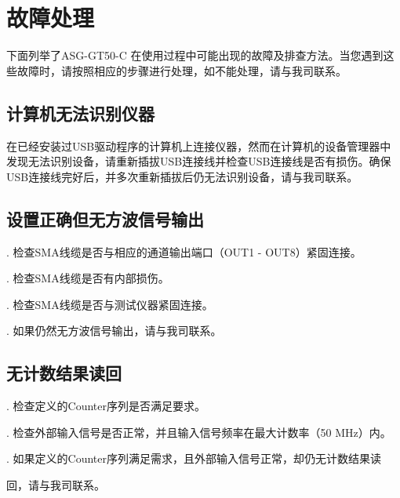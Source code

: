 \chapter{\heiti 故障处理}
下面列举了ASG-GT50-C 在使用过程中可能出现的故障及排查方法。当您遇到这些故障时，请按照相应的步骤进行处理，如不能处理，请与我司联系。

\section{\heiti 计算机无法识别仪器}
在已经安装过USB驱动程序的计算机上连接仪器，然而在计算机的设备管理器中发现无法识别设备，请重新插拔USB连接线并检查USB连接线是否有损伤。确保USB连接线完好后，并多次重新插拔后仍无法识别设备，请与我司联系。

\section{\heiti 设置正确但无方波信号输出}
. 检查SMA线缆是否与相应的通道输出端口（OUT1 - OUT8）紧固连接。 

. 检查SMA线缆是否有内部损伤。

. 检查SMA线缆是否与测试仪器紧固连接。

. 如果仍然无方波信号输出，请与我司联系。


\section{\heiti 无计数结果读回}
. 检查定义的Counter序列是否满足要求。

. 检查外部输入信号是否正常，并且输入信号频率在最大计数率（50 MHz）内。

. 如果定义的Counter序列满足需求，且外部输入信号正常，却仍无计数结果读

\hspace{-1em}回，请与我司联系。
